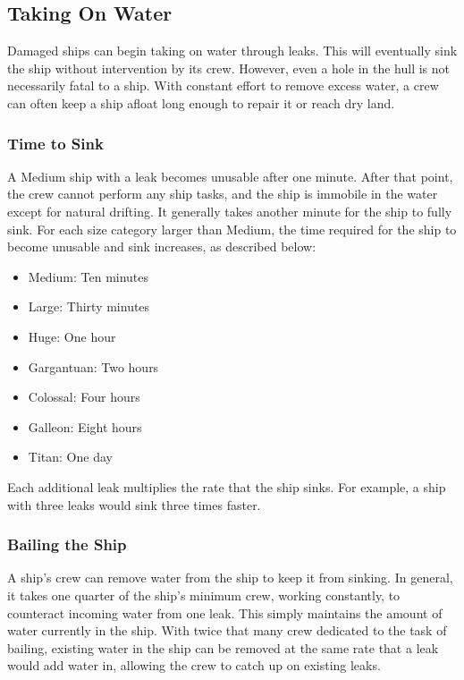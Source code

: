     \subsection{Taking On Water}
        Damaged ships can begin taking on water through leaks.
        This will eventually sink the ship without intervention by its crew.
        However, even a hole in the hull is not necessarily fatal to a ship.
        With constant effort to remove excess water, a crew can often keep a ship afloat long enough to repair it or reach dry land.

        \subsubsection{Time to Sink}
            A Medium ship with a leak becomes unusable after one minute.
            After that point, the crew cannot perform any ship tasks, and the ship is immobile in the water except for natural drifting.
            It generally takes another minute for the ship to fully sink.
            For each size category larger than Medium, the time required for the ship to become unusable and sink increases, as described below:
            \begin{itemize}
                \item Medium: Ten minutes
                \item Large: Thirty minutes
                \item Huge: One hour
                \item Gargantuan: Two hours
                \item Colossal: Four hours
                \item Galleon: Eight hours
                \item Titan: One day
            \end{itemize}

            Each additional leak multiplies the rate that the ship sinks.
            For example, a ship with three leaks would sink three times faster.

        \subsubsection{Bailing the Ship}
            A ship's crew can remove water from the ship to keep it from sinking.
            In general, it takes one quarter of the ship's minimum crew, working constantly, to counteract incoming water from one leak.
            This simply maintains the amount of water currently in the ship.
            With twice that many crew dedicated to the task of bailing, existing water in the ship can be removed at the same rate that a leak would add water in, allowing the crew to catch up on existing leaks.

